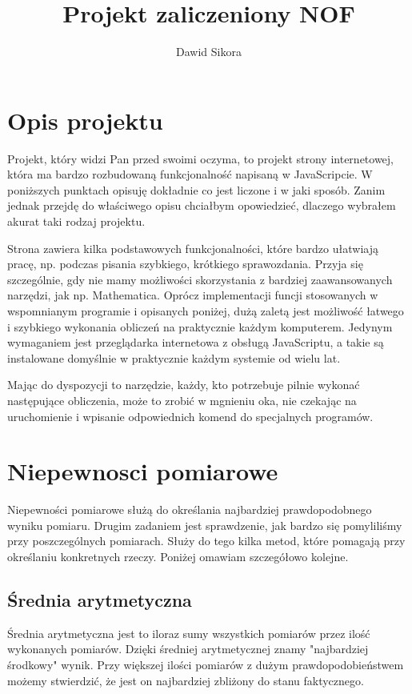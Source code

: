 \documentclass[11pt]{article}
\title{\textbf{Projekt zaliczeniony NOF}}
\author{Dawid Sikora}
\date{}
\begin{document}
\maketitle

\section{Opis projektu}

Projekt, który widzi Pan przed swoimi oczyma, to projekt strony internetowej, która ma bardzo rozbudowaną funkcjonalność napisaną w JavaScripcie. W poniższych punktach opisuję dokładnie co jest liczone i w jaki sposób. Zanim jednak przejdę do właściwego opisu chciałbym opowiedzieć, dlaczego wybrałem akurat taki rodzaj projektu.

Strona zawiera kilka podstawowych funkcjonalności, które bardzo ułatwiają pracę, np. podczas pisania szybkiego, krótkiego sprawozdania. Przyja się szczególnie, gdy nie mamy możliwości skorzystania z bardziej zaawansowanych narzędzi, jak np. Mathematica. Oprócz implementacji funcji stosowanych w wspomnianym programie i opisanych poniżej, dużą zaletą jest możliwość łatwego i szybkiego wykonania obliczeń na praktycznie każdym komputerem. Jedynym wymaganiem jest przeglądarka internetowa z obsługą JavaScriptu, a takie są instalowane domyślnie w praktycznie każdym systemie od wielu lat.

Mając do dyspozycji to narzędzie, każdy, kto potrzebuje pilnie wykonać następujące obliczenia, może to zrobić w mgnieniu oka, nie czekając na uruchomienie i wpisanie odpowiednich komend do specjalnych programów. 

\section{Niepewnosci pomiarowe}

Niepewności pomiarowe służą do określania najbardziej prawdopodobnego wyniku pomiaru. Drugim zadaniem jest sprawdzenie, jak bardzo się pomyliliśmy przy poszczególnych pomiarach. Służy do tego kilka metod, które pomagają przy określaniu konkretnych rzeczy. Poniżej omawiam szczegółowo kolejne.

\subsection{Średnia arytmetyczna}
Średnia arytmetyczna jest to iloraz sumy wszystkich pomiarów przez ilość wykonanych pomiarów. Dzięki średniej arytmetycznej znamy "najbardziej środkowy" wynik. Przy większej ilości pomiarów z dużym prawdopodobieństwem możemy stwierdzić, że jest on najbardziej zbliżony do stanu faktycznego.
\end{document}
